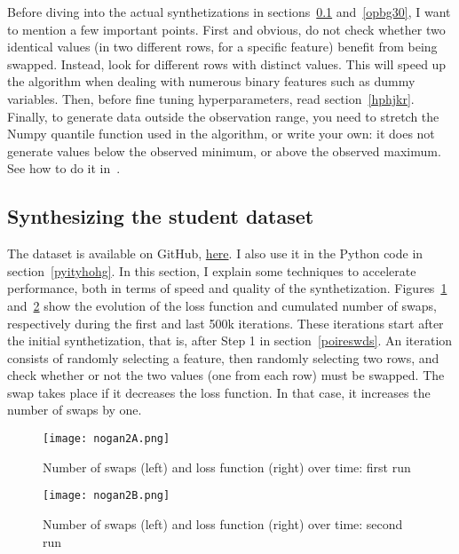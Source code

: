 \documentclass[oneside,10pt]{book}
\begin{document}
Before diving into the actual synthetizations in sections~\ref{opewsd} and~\ref{opbg30}, I want to mention a few important points.
 First and obvious, do not check whether two identical values (in two different rows, for a specific feature) benefit from being swapped. Instead, look for different rows with distinct values. This will speed up the algorithm when dealing with numerous binary features such as dummy variables. Then,
 before fine tuning hyperparameters, read section~\ref{hphjkr}. Finally, to generate data outside the observation range, you need to stretch the Numpy
\textcolor{index}{quantile function} used in the algorithm, or write your own: it does not generate values below the observed minimum, or above the observed maximum.
 See how to do it in~\cite{pcper43w}.

\subsection{Synthesizing the student dataset}\label{opewsd}

The dataset is available on GitHub, \href{https://github.com/VincentGranville/Main/blob/main/students.csv}{here}. I also use it in the Python code in section~\ref{pyityhohg}. In this section, I explain some techniques to accelerate performance, both in terms of speed and quality of the synthetization.
Figures~\ref{fig:nogan2ab} and~\ref{fig:nogan2abc} show the evolution of the loss function and cumulated number of swaps, respectively during the first and last 500k iterations.
 These iterations start after the initial synthetization, that is, after Step 1 in section~\ref{poireswds}.
An iteration consists of randomly selecting a feature, then randomly selecting two rows, and check whether or not the two values (one from each row) must be swapped. The swap takes place if it decreases the loss function. In that case, it increases the number of swaps by one.




\begin{figure}[H]
\centering
\texttt{[image: nogan2A.png]} %
\caption{Number of swaps (left) and loss function (right) over time: first run}
\label{fig:nogan2ab}
\end{figure}


\begin{figure}[H]
\centering
\texttt{[image: nogan2B.png]} %
\caption{Number of swaps (left) and loss function (right) over time: second run}
\label{fig:nogan2abc}
\end{figure}
\end{document}
